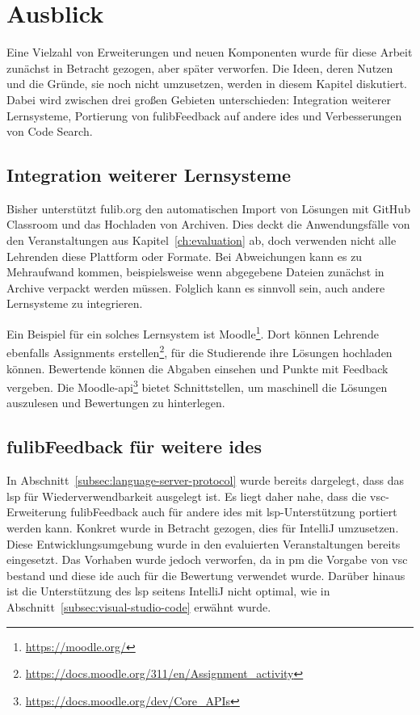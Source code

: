 \chapter{Ausblick}\label{ch:future-work}

Eine Vielzahl von Erweiterungen und neuen Komponenten wurde für diese Arbeit zunächst in Betracht gezogen, aber später verworfen.
Die Ideen, deren Nutzen und die Gründe, sie noch nicht umzusetzen, werden in diesem Kapitel diskutiert.
Dabei wird zwischen drei großen Gebieten unterschieden:
Integration weiterer Lernsysteme, Portierung von fulibFeedback auf andere \acp{ide} und Verbesserungen von Code Search.

\section{Integration weiterer Lernsysteme}

Bisher unterstützt fulib.org den automatischen Import von Lösungen mit GitHub Classroom und das Hochladen von Archiven.
Dies deckt die Anwendungsfälle von den Veranstaltungen aus Kapitel~\ref{ch:evaluation} ab, doch verwenden nicht alle Lehrenden diese Plattform oder Formate.
Bei Abweichungen kann es zu Mehraufwand kommen, beispielsweise wenn abgegebene Dateien zunächst in Archive verpackt werden müssen.
Folglich kann es sinnvoll sein, auch andere Lernsysteme zu integrieren.

Ein Beispiel für ein solches Lernsystem ist Moodle\footnote{\url{https://moodle.org/}}.
Dort können Lehrende ebenfalls Assignments erstellen\footnote{\url{https://docs.moodle.org/311/en/Assignment_activity}}, für die Studierende ihre Lösungen hochladen können.
Bewertende können die Abgaben einsehen und Punkte mit Feedback vergeben.
Die Moodle-\ac{api}\footnote{\url{https://docs.moodle.org/dev/Core_APIs}} bietet Schnittstellen, um maschinell die Lösungen auszulesen und Bewertungen zu hinterlegen.

\section{fulibFeedback für weitere \acsp{ide}}\label{sec:other-ides}

In Abschnitt~\ref{subsec:language-server-protocol} wurde bereits dargelegt, dass das \ac{lsp} für Wiederverwendbarkeit ausgelegt ist.
Es liegt daher nahe, dass die \ac{vsc}-Erweiterung fulibFeedback auch für andere \acp{ide} mit \ac{lsp}-Unterstützung portiert werden kann.
Konkret wurde in Betracht gezogen, dies für IntelliJ umzusetzen.
Diese Entwicklungsumgebung wurde in den evaluierten Veranstaltungen bereits eingesetzt.
Das Vorhaben wurde jedoch verworfen, da in \ac{pm} die Vorgabe von \ac{vsc} bestand und diese \ac{ide} auch für die Bewertung verwendet wurde.
Darüber hinaus ist die Unterstützung des \ac{lsp} seitens IntelliJ nicht optimal, wie in Abschnitt~\ref{subsec:visual-studio-code} erwähnt wurde.

